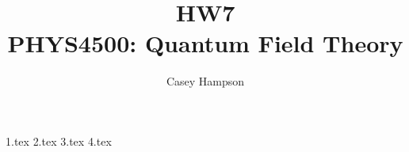 \documentclass[titlepage]{article}
\title{HW7 \\[5pt] PHYS4500: Quantum Field Theory}
\author{Casey Hampson}
\begin{document}
    \maketitle
    \pagebreak

    {1.tex}
    {2.tex} 
    {3.tex}
    {4.tex}
\end{document}
